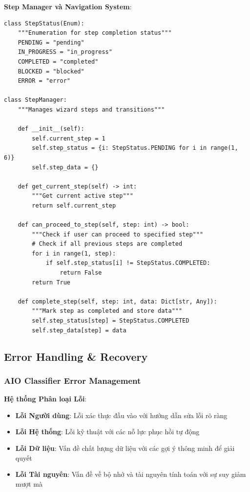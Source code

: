 \textbf{Step Manager và Navigation System}:

\begin{verbatim}
class StepStatus(Enum):
    """Enumeration for step completion status"""
    PENDING = "pending"
    IN_PROGRESS = "in_progress"
    COMPLETED = "completed"
    BLOCKED = "blocked"
    ERROR = "error"

class StepManager:
    """Manages wizard steps and transitions"""
    
    def __init__(self):
        self.current_step = 1
        self.step_status = {i: StepStatus.PENDING for i in range(1, 6)}
        self.step_data = {}
        
    def get_current_step(self) -> int:
        """Get current active step"""
        return self.current_step
        
    def can_proceed_to_step(self, step: int) -> bool:
        """Check if user can proceed to specified step"""
        # Check if all previous steps are completed
        for i in range(1, step):
            if self.step_status[i] != StepStatus.COMPLETED:
                return False
        return True
        
    def complete_step(self, step: int, data: Dict[str, Any]):
        """Mark step as completed and store data"""
        self.step_status[step] = StepStatus.COMPLETED
        self.step_data[step] = data
\end{verbatim}

\subsection{Error Handling \& Recovery}\label{subsec:error-handling}

\subsubsection{AIO Classifier Error Management}

\textbf{Hệ thống Phân loại Lỗi}:
\begin{itemize}
    \item \textbf{Lỗi Người dùng}: Lỗi xác thực đầu vào với hướng dẫn sửa lỗi rõ ràng
    \item \textbf{Lỗi Hệ thống}: Lỗi kỹ thuật với các nỗ lực phục hồi tự động
    \item \textbf{Lỗi Dữ liệu}: Vấn đề chất lượng dữ liệu với các gợi ý thông minh để giải quyết
    \item \textbf{Lỗi Tài nguyên}: Vấn đề về bộ nhớ và tài nguyên tính toán với sự suy giảm mượt mà
\end{itemize}

